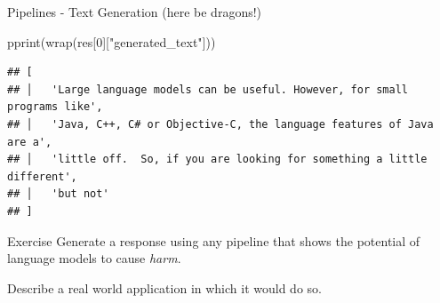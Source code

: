 \documentclass[
  10pt,
  ignorenonframetext,
  aspectratio=169]{beamer}
\newenvironment{Shaded}{\begin{snugshade}}{\end{snugshade}}
\newcommand{\DecValTok}[1]{\textcolor[rgb]{0.86,0.86,0.80}{#1}}
\newcommand{\NormalTok}[1]{\textcolor[rgb]{0.80,0.80,0.80}{#1}}
\newcommand{\StringTok}[1]{\textcolor[rgb]{0.80,0.58,0.58}{#1}}
\begin{document}
\begin{frame}[fragile]{Pipelines - Text Generation (here be dragons!)}
\begin{Shaded}
\begin{Highlighting}[]
\NormalTok{pprint(wrap(res[}\DecValTok{0}\NormalTok{][}\StringTok{"generated\_text"}\NormalTok{]))}
\end{Highlighting}
\end{Shaded}

\begin{verbatim}
## [
## │   'Large language models can be useful. However, for small programs like',
## │   'Java, C++, C# or Objective-C, the language features of Java are a',
## │   'little off.  So, if you are looking for something a little different',
## │   'but not'
## ]
\end{verbatim}
\end{frame}

\begin{frame}{Exercise}
\protect\hypertarget{exercise}{}
Generate a response using any pipeline that shows the potential of
language models to cause \emph{harm}.

Describe a real world application in which it would do so.
\end{frame}
\end{document}
